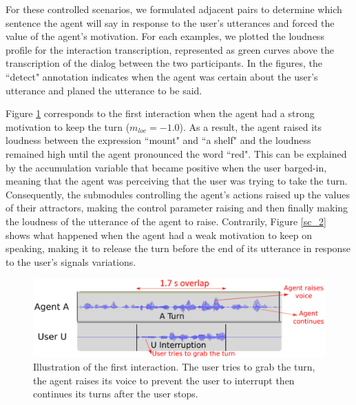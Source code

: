 For these controlled scenarios, we formulated adjacent pairs to determine which sentence the agent will say in response to the user's utterances and forced the value of the agent's motivation. 
For each examples, we plotted the loudness profile for the interaction transcription, represented as green curves above the transcription of the dialog between the two participants. In the figures, the ``detect" annotation indicates when the agent was certain about the user's utterance and planed the utterance to be said. 

Figure \ref{sc_1} corresponds to the first interaction when the agent had a strong motivation to keep the turn ($m_{loc}=-1.0$). 
As a result, the agent raised its loudness between the expression ``mount" and ``a shelf" and the loudness remained high until the agent pronounced the word ``red". This can be explained by the accumulation variable that became positive when the user barged-in, meaning that the agent was perceiving that the user was trying to take the turn. 
Consequently, the submodules controlling the agent's actions raised up the values of their attractors, making the control parameter raising and then finally making the loudness of the utterance of the agent to raise. 
Contrarily, Figure \ref{sc_2} shows what happened when the agent had a weak motivation to keep on speaking, making it to release the turn before the end of its utterance in response to the user's signals variations.

\begin{figure}
  \centering
  \includegraphics[width=\linewidth]{figure/volume_transcript_1_1_refait.eps}
  \caption{Illustration of the first interaction. The user tries to grab the turn, the agent raises its voice to prevent the user to interrupt then continues its turns after the user stops.}
  \label{sc_1}
\end{figure}


